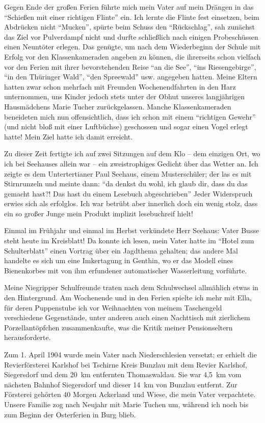 Gegen Ende der großen Ferien führte mich mein Vater auf mein Drängen in das \enquote{Schießen mit einer richtigen Flinte} ein. Ich lernte die Flinte fest einsetzen, beim Abdrücken nicht \enquote{Mucken}, spürte beim Schuss den \enquote{Rückschlag}, sah zunächst das Ziel vor Pulverdampf nicht und durfte schließlich nach einigen Probeschüssen einen Neuntöter erlegen. Das genügte, um nach dem Wiederbeginn der Schule mit Erfolg vor den Klassenkameraden angeben zu können, die ihrerseits schon vielfach vor den Ferien mit ihrer bevorstehenden Reise \enquote{an die See}, \enquote{ins Riesengebirge}, \enquote{in den Thüringer Wald}, \enquote{den Spreewald} usw. angegeben hatten. Meine Eltern hatten zwar schon mehrfach mit Freunden Wochenendfahrten in den Harz unternommen, uns Kinder jedoch stets unter der Obhut unseres langjährigen Hausmädchens Marie Tucher zurückgelassen. Manche Klassenkameraden beneideten mich nun offensichtlich, dass ich schon mit einem \enquote{richtigen Gewehr} (und nicht bloß mit einer Luftbüchse) geschossen und sogar einen Vogel erlegt hatte! Mein Ziel hatte ich damit erreicht.

Zu dieser Zeit fertigte ich auf zwei Sitzungen auf dem Klo -- dem einzigen Ort, wo ich bei Seehauses allein war -- ein zweistrophiges Gedicht über das Wetter an. Ich zeigte es dem Untertertianer Paul Seehaus, einem Musterschüler; der las es mit Stirnrunzeln und meinte dann: \enquote{da denkst du wohl, ich glaub dir, dass du das gemacht hast?! Das hast du einem Lesebuch abgeschrieben} Jeder Widerspruch erwies sich als erfolglos. Ich war betrübt aber innerlich doch ein wenig stolz, dass ein so großer Junge mein Produkt implizit lesebuchreif hielt!

Einmal im Frühjahr und einmal im Herbst verkündete Herr Seehaus: Vater Busse steht heute im Kreisblatt! Da konnte ich lesen, mein Vater hatte im \enquote{Hotel zum Schulterblatt} einen Vortrag über ein Jagdthema gehalten; das andere Mal handelte es sich um eine Imkertagung in Genthin, wo er das Modell eines Bienenkorbes mit von ihm erfundener automatischer Wasserleitung vorführte.

Meine Niegripper Schulfreunde traten nach dem Schulwechsel allmählich etwas in den Hintergrund. Am Wochenende und in den Ferien spielte ich mehr mit Ella, für deren Puppenstube ich vor Weihnachten von meinem Taschengeld verschiedene Gegenstände, unter anderen auch einen Nachttisch mit zierlichem Porzellantöpfchen zusammenkaufte, was die Kritik meiner Pensionseltern herausforderte.

Zum 1. April 1904 wurde mein Vater nach Niederschlesien versetzt; er erhielt die Revierförsterei Karlshof bei Tschirne Kreis Bunzlau mit dem Revier Karlshof, Siegersdorf und dem 20~km entfernten Thomaswaldau. Sie war 4,5~km vom nächsten Bahnhof Siegersdorf und dieser 14~km von Bunzlau entfernt. Zur Försterei gehörten 40 Morgen Ackerland und Wiese, die mein Vater verpachtete. Unsere Familie zog nach Neujahr mit Marie Tuchen um, während ich noch bis zum Beginn der Osterferien in Burg blieb.

